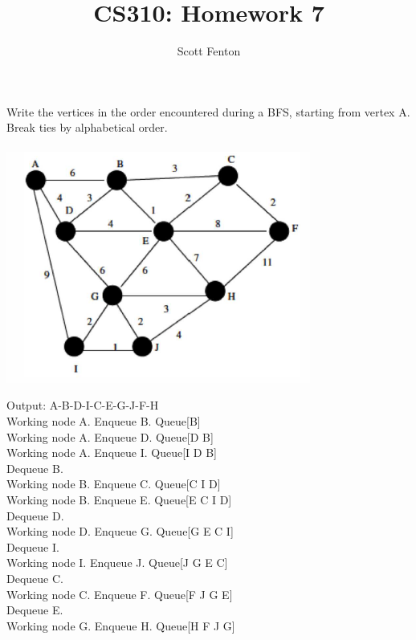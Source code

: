 \documentclass[10pt]{article}
\newenvironment{exercise}[2][Exercise]{\begin{trivlist}
\item[\hskip \labelsep {\bfseries #1}\hskip \labelsep {\bfseries #2.}]}{\end{trivlist}}
\newenvironment{solution}[2][Solution]{\begin{trivlist}
\item[\hskip \labelsep {\bfseries #1}\hskip \labelsep {\bfseries #2.}]}{\end{trivlist}}
\theoremstyle{definition}
\begin{document}
 
 
 
\title{CS310: Homework 7}%
\author{Scott Fenton\\ %
} %
 
\maketitle
\begin{exercise}{(1)}
Write the vertices in the order encountered during a BFS, starting from vertex A. Break ties
by alphabetical order.\\
\\
\includegraphics[width=100mm,scale=0.3]{p1.PNG}\\
\end{exercise}

\begin{solution}{(1)}
Output: A-B-D-I-C-E-G-J-F-H	\\
Working node A. Enqueue B. Queue[B]\\
Working node A. Enqueue D. Queue[D B]\\
Working node A. Enqueue I. Queue[I D B]\\
Dequeue B.\\
Working node B. Enqueue C. Queue[C I D]\\
Working node B. Enqueue E. Queue[E C I D]\\
Dequeue D.\\
Working node D. Enqueue G. Queue[G E C I]\\
Dequeue I.\\
Working node I. Enqueue J. Queue[J G E C]\\
Dequeue C.\\
Working node C. Enqueue F. Queue[F J G E]\\
Dequeue E.\\
Working node G. Enqueue H. Queue[H F J G]\\
\end{solution}
\end{document}
